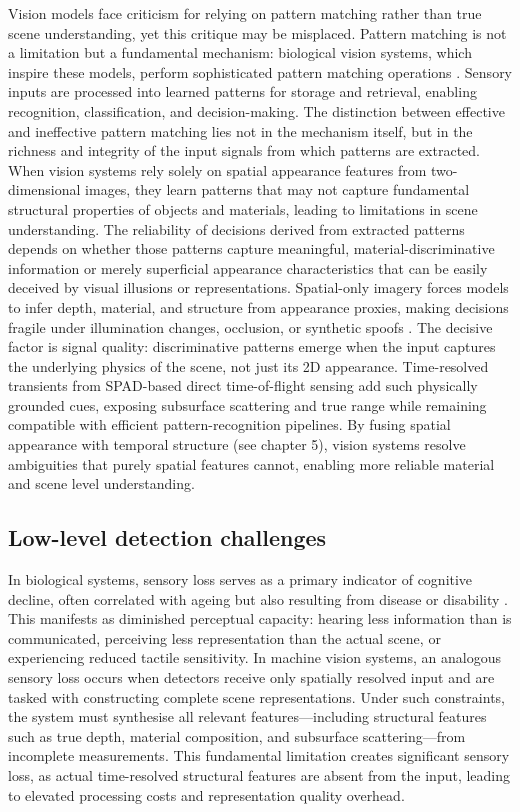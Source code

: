 \documentclass[12pt,a4paper,oneside]{report}
\begin{document}
Vision models face criticism for relying on pattern matching rather than true scene understanding, yet this critique may be misplaced. Pattern matching is not a limitation but a fundamental mechanism: biological vision systems, which inspire these models, perform sophisticated pattern matching operations \cite{marr2010,lecun1998,fukushima1980}. Sensory inputs are processed into learned patterns for storage and retrieval, enabling recognition, classification, and decision-making. The distinction between effective and ineffective pattern matching lies not in the mechanism itself, but in the richness and integrity of the input signals from which patterns are extracted. When vision systems rely solely on spatial appearance features from two-dimensional images, they learn patterns that may not capture fundamental structural properties of objects and materials, leading to limitations in scene understanding. The reliability of decisions derived from extracted patterns depends on whether those patterns capture meaningful, material-discriminative information or merely superficial appearance characteristics that can be easily deceived by visual illusions or representations. Spatial-only imagery forces models to infer depth, material, and structure from appearance proxies, making decisions fragile under illumination changes, occlusion, or synthetic spoofs \cite{sharan2013,schwartz2013}. The decisive factor is signal quality: discriminative patterns emerge when the input captures the underlying physics of the scene, not just its 2D appearance. Time-resolved transients from SPAD-based direct time-of-flight sensing add such physically grounded cues, exposing subsurface scattering and true range while remaining compatible with efficient pattern-recognition pipelines. By fusing spatial appearance with temporal structure (see chapter 5), vision systems resolve ambiguities that purely spatial features cannot, enabling more reliable material and scene level understanding.

\subsection{Low-level detection challenges}
\label{subsec:low_level_detection}

In biological systems, sensory loss serves as a primary indicator of cognitive decline, often correlated with ageing but also resulting from disease or disability \cite{bernabei2014,dammeyer2010}. This manifests as diminished perceptual capacity: hearing less information than is communicated, perceiving less representation than the actual scene, or experiencing reduced tactile sensitivity. In machine vision systems, an analogous sensory loss occurs when detectors receive only spatially resolved input and are tasked with constructing complete scene representations. Under such constraints, the system must synthesise all relevant features—including structural features such as true depth, material composition, and subsurface scattering—from incomplete measurements. This fundamental limitation creates significant sensory loss, as actual time-resolved structural features are absent from the input, leading to elevated processing costs and representation quality overhead.
\end{document}
